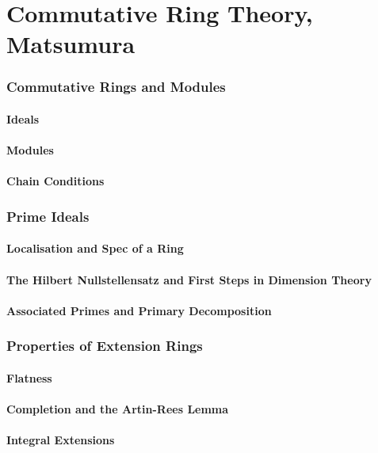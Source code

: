\part{Commutative Ring Theory, Matsumura}

\section{Commutative Rings and Modules}
\subsection{Ideals}
\subsection{Modules}
\subsection{Chain Conditions}

\section{Prime Ideals}
\subsection{Localisation and Spec of a Ring}
\subsection{The Hilbert Nullstellensatz and First Steps in Dimension Theory}
\subsection{Associated Primes and Primary Decomposition}

\section{Properties of Extension Rings}
\subsection{Flatness}
\subsection{Completion and the Artin-Rees Lemma}
\subsection{Integral Extensions}

